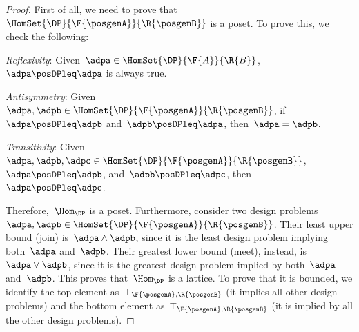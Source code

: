 \begin{proof}
    First of all, we need to prove that~$\HomSet{\DP}{\F{\posgenA}}{\R{\posgenB}}$ is a poset. To prove this, we check the following:

    \begin{compactitem}
        \item \emph{Reflexivity}: Given~$\adpa\in \HomSet{\DP}{\F{A}}{\R{B}}$,~$\adpa\posDPleq \adpa$ is always true.
        \item \emph{Antisymmetry}: Given~$\adpa,\adpb\in \HomSet{\DP}{\F{\posgenA}}{\R{\posgenB}}$, if~$\adpa\posDPleq \adpb$ and~$\adpb\posDPleq \adpa$, then~$\adpa=\adpb$.
        \item \emph{Transitivity}: Given~$\adpa,\adpb,\adpc\in \HomSet{\DP}{\F{\posgenA}}{\R{\posgenB}}$,~$\adpa\posDPleq \adpb$, and~$\adpb\posDPleq \adpc$, then~$\adpa\posDPleq \adpc$.
    \end{compactitem}
    Therefore,~$\Hom_\DP$ is a poset.
    Furthermore, consider two design problems~$\adpa,\adpb\in \HomSet{\DP}{\F{\posgenA}}{\R{\posgenB}}$.
    Their least upper bound (join) is~$\adpa\wedge \adpb$, since it is the least design problem implying both~$\adpa$ and~$\adpb$.
    Their greatest lower bound (meet), instead, is~$\adpa\vee \adpb$, since it is the greatest design problem implied by both~$\adpa$ and~$\adpb$.
    This proves that~$\Hom_\DP$ is a lattice.
    To prove that it is bounded, we identify the top element as~$\top_{\F{\posgenA},\R{\posgenB}}$ (it implies all other design problems) and the bottom element as~$\top_{\F{\posgenA},\R{\posgenB}}$ (it is implied by all the other design problems).
\end{proof}

